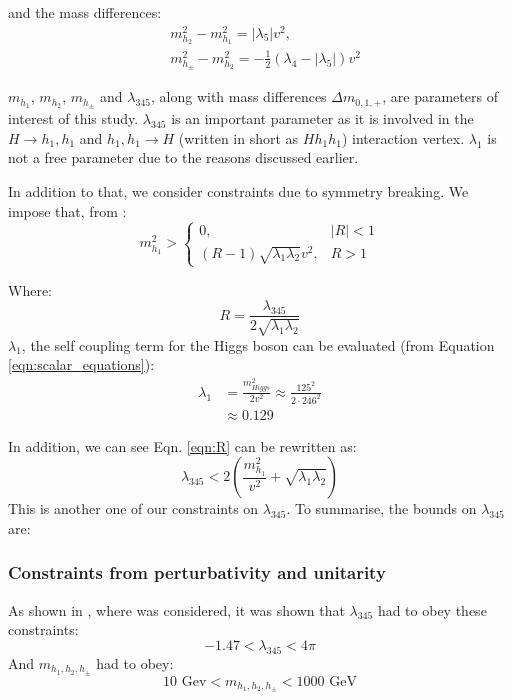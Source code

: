 \documentclass[12pt]{article}
\begin{document}
and the mass differences: 
\begin{align}
    &m_{h_2}^2 - m_{h_1}^2 =  |\lambda_5|v^2, \\
    &m_{h_\pm}^2 - m_{h_2}^2 = -\frac{1}{2}(\lambda_4 - |\lambda_5|)v^2
\end{align}

$m_{h_1}$, $m_{h_2}$, $m_{h_\pm}$ and $\lambda_{345}$, along with mass differences $\Delta m_{0, 1, +}$, are parameters of interest of this study. $\lambda_{345}$ is an important parameter as it is involved in the $H\rightarrow h_1,h_1$ and $h_1,h_1 \rightarrow H$ (written in short as $Hh_1h_1$) interaction vertex. $\lambda_1$ is not a free parameter due to the reasons discussed earlier.

In addition to that, we consider constraints due to symmetry breaking. We impose that, from \cite{Belyaev:2016lok, Ginzburg2010}:
\begin{equation}
    m_{h_1}^2 >
        \begin{cases}
         0, & |R| < 1\\
         (R-1) \sqrt{\lambda_1\lambda_2} v^2, & R>1
        \end{cases}
        \label{eqn:R}
\end{equation}

Where:
\begin{equation}
    R = \frac{\lambda_{345}}{2\sqrt{\lambda_1\lambda_2}}
\end{equation}
$\lambda_1$, the self coupling term for the Higgs boson can be evaluated (from Equation \ref{eqn:scalar_equations}):
\begin{equation}
    \begin{split}
        \lambda_1 &= \frac{m^2_{Higgs}}{2 v^2}
                \approx\frac{125^2}{2\cdot 246 ^ 2} \\
                &\approx0.129
    \end{split}
\end{equation}

In addition, we can see Eqn. \ref{eqn:R} can be rewritten as:
\begin{equation}
    \lambda_{345} < 2\left( \frac{m_{h_1}^2}{v^2} + \sqrt{\lambda_1\lambda_2}\right)
\end{equation}
This is another one of our constraints on $\lambda_{345}$. To summarise, the bounds on $\lambda_{345}$ are: 
\subsubsection{Constraints from perturbativity and unitarity}
As shown in \cite{Belyaev:2016lok}, where \cite{Aruhrib2012Inert} was considered, it was shown that $\lambda_{345}$ had to obey these constraints:
\begin{equation}
    -1.47 < \lambda_{345} < 4\pi
    \label{eqn:l345_pert}
\end{equation}
And $m_{h_1, h_2, h_\pm}$ had to obey:
\begin{equation}
    10\text{ Gev} < m_{h_1, h_2, h_\pm} < 1000\text{ GeV}
    \label{eqn:masses_pert}
\end{equation}
\end{document}
